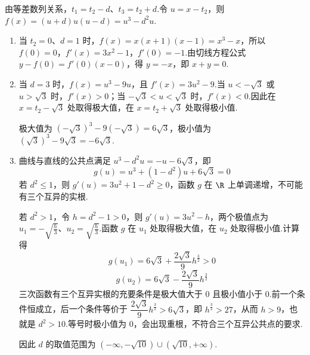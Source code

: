 \begin{solution}
由等差数列关系，\(t_1=t_2-d\)、\(t_3=t_2+d\).令 \(u=x-t_2\)，则
\(f(x)=(u+d)u(u-d)=u^3-d^2u\).

\begin{enumerate}
\item 当 \(t_2=0\)、\(d=1\) 时，\(f(x)=x(x+1)(x-1)=x^3-x\)，所以 \(f(0)=0\)，\(f'(x)=3x^2-1\)，\(f'(0)=-1\).由切线方程公式
\(y-f(0)=f'(0)(x-0)\)，得 \(y=-x\)，即 \(x+y=0\).

\item 当 \(d=3\) 时，\(f(x)=u^3-9u\)，且 \(f'(x)=3u^2-9\).当 \(u<-\sqrt3\) 或 \(u>\sqrt3\) 时，\(f'(x)>0\)；当 \(-\sqrt3<u<\sqrt3\) 时，\(f'(x)<0\).因此在 \(x=t_2-\sqrt3\) 处取得极大值，在 \(x=t_2+\sqrt3\) 处取得极小值.

极大值为 \((-\sqrt3)^3-9(-\sqrt3)=6\sqrt3\)，极小值为 \((\sqrt3)^3-9\sqrt3=-6\sqrt3\).

\item 曲线与直线的公共点满足
\(u^3-d^2u=-u-6\sqrt3\)，即
\[
g(u)=u^3+(1-d^2)u+6\sqrt3=0
\]
若 \(d^2\le1\)，则 \(g'(u)=3u^2+1-d^2\ge0\)，函数 \(g\) 在 \(\R\) 上单调递增，不可能有三个互异的实根.

若 \(d^2>1\)，令 \(h=d^2-1>0\)，则 \(g'(u)=3u^2-h\)，两个极值点为 \(u_1=-\sqrt{\frac{h}{3}}\)、\(u_2=\sqrt{\frac{h}{3}}\).函数 \(g\) 在 \(u_1\) 处取得极大值，在 \(u_2\) 处取得极小值.计算得
\[
g(u_1)=6\sqrt3+\frac{2\sqrt3}{9}h^{\frac{3}{2}}>0
\]
\[
g(u_2)=6\sqrt3-\frac{2\sqrt3}{9}h^{\frac{3}{2}}
\]
三次函数有三个互异实根的充要条件是极大值大于 \(0\) 且极小值小于 \(0\).前一个条件恒成立，后一个条件等价于
\(\dfrac{2\sqrt3}{9}h^{\frac{3}{2}}>6\sqrt3\)，即 \(h^{\frac{3}{2}}>27\)，从而 \(h>9\)，也就是 \(d^2>10\).等号时极小值为 \(0\)，会出现重根，不符合三个互异公共点的要求.

因此 \(d\) 的取值范围为 \(\left(-\infty,-\sqrt{10}\right)\cup\left(\sqrt{10},+\infty\right)\).
\end{enumerate}
\end{solution}
